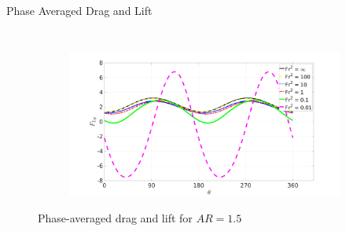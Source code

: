 \documentclass[aspectratio=169,xcolor=dvipsnames]{beamer}
\begin{document}
\begin{frame}{Phase Averaged Drag and Lift}
\begin{columns}[c]
\begin{figure}
\begin{subfigure}[b]{.49\textwidth}
            \end{subfigure}
            \begin{subfigure}[b]{.49\textwidth}
                \includegraphics[width=\textwidth]{figures/palift1p5.pdf}
            \end{subfigure}
            \caption{Phase-averaged drag and lift for $AR = 1.5$}
        \end{figure}

\end{columns}
\end{frame}

\end{document}
